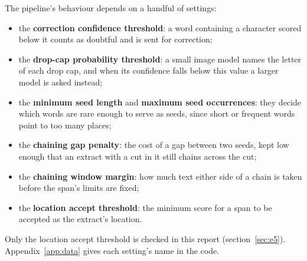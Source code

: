 The pipeline's behaviour depends on a handful of settings:
\begin{itemize}
  \item the \textbf{correction confidence threshold}: a word containing a
    character scored below it counts as doubtful and is sent for correction;
  \item the \textbf{drop-cap probability threshold}: a small image model names
    the letter of each drop cap, and when its confidence falls below this value
    a larger model is asked instead;
  \item the \textbf{minimum seed length} and \textbf{maximum seed occurrences}:
    they decide which words are rare enough to serve as seeds, since short or
    frequent words point to too many places;
  \item the \textbf{chaining gap penalty}: the cost of a gap between two seeds,
    kept low enough that an extract with a cut in it still chains across the
    cut;
  \item the \textbf{chaining window margin}: how much text either side of a
    chain is taken before the span's limits are fixed;
  \item the \textbf{location accept threshold}: the minimum score for a span to
    be accepted as the extract's location.
\end{itemize}
Only the location accept threshold is checked in this report
(section~\ref{sec:e5}). Appendix~\ref{app:data} gives each setting's name in
the code.
